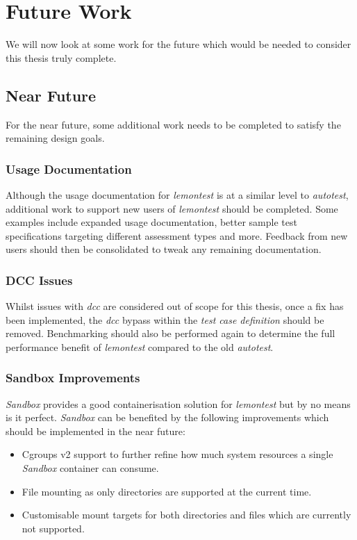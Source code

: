 \documentclass[hidelinks]{report}
\newcommand{\unchapter}[2]{
    \setcounter{chapter}{#1}
    \setcounter{section}{0}
    \chapter*{#2}
    \addcontentsline{toc}{chapter}{#2}
}
\begin{document}
\unchapter{7}{Future Work}
We will now look at some work for the future which would be needed to consider this thesis truly complete.

\section{Near Future}
For the near future, some additional work needs to be completed to satisfy the remaining design goals.
\subsection{Usage Documentation}
Although the usage documentation for \textit{lemontest} is at a similar level to \textit{autotest}, additional work to support new users of \textit{lemontest} should be completed. Some examples include expanded usage documentation, better sample test specifications targeting different assessment types and more. Feedback from new users should then be consolidated to tweak any remaining documentation.

\subsection{DCC Issues}
Whilst issues with \textit{dcc} are considered out of scope for this thesis, once a fix has been implemented, the \textit{dcc} bypass within the \textit{test case definition} should be removed. Benchmarking should also be performed again to determine the full performance benefit of \textit{lemontest} compared to the old \textit{autotest}. 

\subsection{Sandbox Improvements}
\textit{Sandbox} provides a good containerisation solution for \textit{lemontest} but by no means is it perfect. \textit{Sandbox} can be benefited by the following improvements which should be implemented in the near future:
\begin{itemize}
	\item Cgroups v2 support to further refine how much system resources a single \textit{Sandbox} container can consume.
	\item File mounting as only directories are supported at the current time.
	\item Customisable mount targets for both directories and files which are currently not supported.
\end{itemize}
\end{document}
